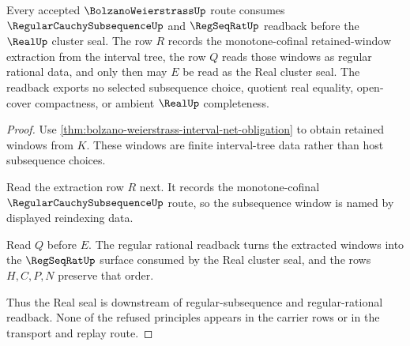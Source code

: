 \begin{theorem}
\label{thm:bolzano-weierstrass-regular-subsequence-window-readback}
Every accepted $\BolzanoWeierstrassUp$ route consumes $\RegularCauchySubsequenceUp$ and $\RegSeqRatUp$ readback before the $\RealUp$ cluster seal. The row $R$ records the monotone-cofinal retained-window extraction from the interval tree, the row $Q$ reads those windows as regular rational data, and only then may $E$ be read as the Real cluster seal. The readback exports no selected subsequence choice, quotient real equality, open-cover compactness, or ambient $\RealUp$ completeness.
\end{theorem}
\begin{proof}
Use \autoref{thm:bolzano-weierstrass-interval-net-obligation} to obtain retained windows from $K$. These windows are finite interval-tree data rather than host subsequence choices.

Read the extraction row $R$ next. It records the monotone-cofinal $\RegularCauchySubsequenceUp$ route, so the subsequence window is named by displayed reindexing data.

Read $Q$ before $E$. The regular rational readback turns the extracted windows into the $\RegSeqRatUp$ surface consumed by the Real cluster seal, and the rows $H,C,P,N$ preserve that order.

Thus the Real seal is downstream of regular-subsequence and regular-rational readback. None of the refused principles appears in the carrier rows or in the transport and replay route.
\end{proof}

